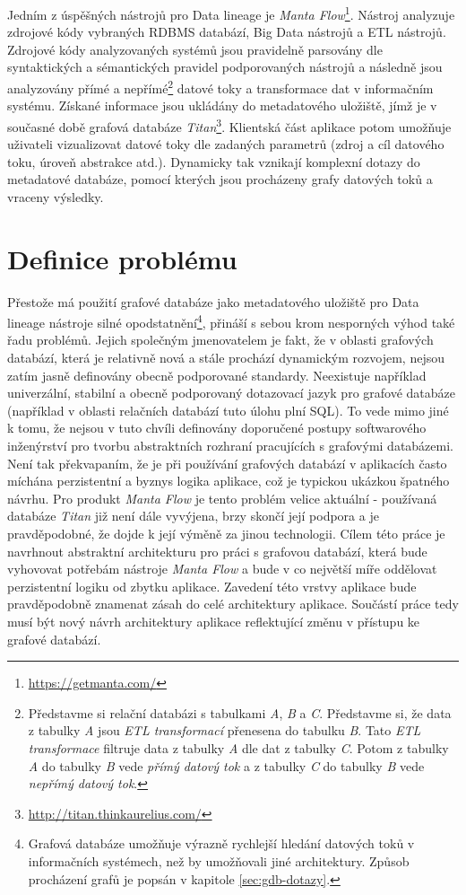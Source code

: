 Jedním z úspěšných nástrojů pro Data lineage je \textit{Manta Flow}\footnote{\url{https://getmanta.com/}}. Nástroj analyzuje zdrojové kódy vybraných RDBMS databází, Big Data nástrojů a ETL nástrojů.
Zdrojové kódy analyzovaných systémů jsou pravidelně parsovány dle syntaktických a sémantických pravidel podporovaných nástrojů a následně jsou analyzovány přímé a nepřímé\footnote{Představme si relační databázi s tabulkami \textit{A}, \textit{B} a \textit{C}. Představme si, že data z tabulky \textit{A} jsou \textit{ETL transformací} přenesena do tabulku \textit{B}. Tato \textit{ETL transformace} filtruje data z tabulky \textit{A} dle dat z tabulky \textit{C}. Potom z tabulky \textit{A} do tabulky \textit{B} vede \textit{přímý datový tok} a z tabulky \textit{C} do tabulky \textit{B} vede \textit{nepřímý datový tok}.} datové toky a transformace dat v informačním systému.
Získané informace jsou ukládány do metadatového uložiště, jímž je v současné době grafová databáze \textit{Titan}\footnote{\url{http://titan.thinkaurelius.com/}}. Klientská část aplikace potom umožňuje uživateli vizualizovat datové toky dle zadaných parametrů (zdroj a cíl datového toku, úroveň abstrakce atd.). Dynamicky tak vznikají komplexní dotazy do metadatové databáze, pomocí kterých jsou procházeny grafy datových toků a vraceny výsledky.

\section{Definice problému}
Přestože má použití grafové databáze jako metadatového uložiště pro Data lineage nástroje silné opodstatnění\footnote{Grafová databáze umožňuje výrazně rychlejší hledání datových toků v informačních systémech, než by umožňovali jiné architektury. Způsob procházení grafů je popsán v kapitole \ref{sec:gdb-dotazy}.}, přináší s sebou krom nesporných výhod také řadu problémů. Jejich společným jmenovatelem je fakt, že v oblasti grafových databází, která je relativně nová a stále prochází dynamickým rozvojem, nejsou zatím jasně definovány obecně podporované standardy. Neexistuje například univerzální, stabilní a obecně podporovaný dotazovací jazyk pro grafové databáze (například v oblasti relačních databází tuto úlohu plní SQL). To vede mimo jiné k tomu, že nejsou v tuto chvíli definovány doporučené postupy softwarového inženýrství pro tvorbu abstraktních rozhraní pracujících s grafovými databázemi. Není tak překvapaním, že je při používání grafových databází v aplikacích často míchána perzistentní a byznys logika aplikace, což je typickou ukázkou špatného návrhu\cite{Taylor09}. Pro produkt \textit{Manta Flow} je tento problém velice aktuální - používaná databáze \textit{Titan} již není dále vyvýjena, brzy skončí její podpora \cite{Titan04} a je pravděpodobné, že dojde k její výměně za jinou technologii. Cílem této práce je navrhnout abstraktní architekturu pro práci s grafovou databází, která bude vyhovovat potřebám nástroje \textit{Manta Flow} a bude v co největší míře oddělovat perzistentní logiku od zbytku aplikace. Zavedení této vrstvy aplikace bude pravděpodobně znamenat zásah do celé architektury aplikace. Součástí práce tedy musí být nový návrh architektury aplikace reflektující změnu v přístupu ke grafové databází.

